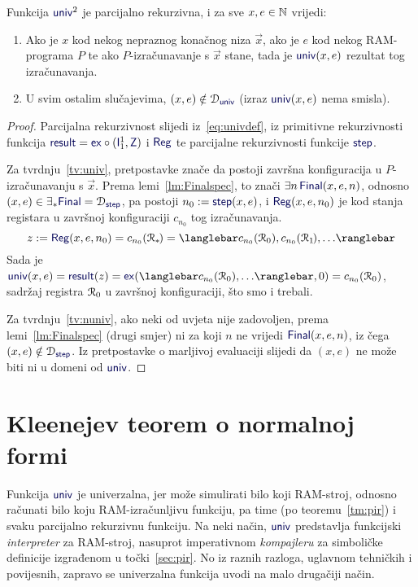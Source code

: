 \begin{lema}[{name=[parcijalna rekurzivnost univerzalne funkcije]}]\label{lm:univspec}
Funkcija $\f{univ}^2$ je parcijalno rekurzivna, i za sve $x,e\in{\mathbb N}$ vrijedi:
\begin{enumerate}
    \item\label{tv:univ} Ako je $x$ kod nekog nepraznog konačnog niza $\vec x$, ako je $e$ kod nekog RAM-programa $P$ te ako $P$-izračunavanje s $\vec x$ stane, tada je $\f{univ}(x,e)$ rezultat tog izračunavanja.
    \item\label{tv:nuniv} U svim ostalim slučajevima, $(x,e)\notin\dom{\f{univ}}$ (izraz $\f{univ}(x,e)$ nema smisla).
\end{enumerate}
\end{lema}
\begin{proof}
Parcijalna rekurzivnost slijedi iz~\eqref{eq:univdef}, iz primitivne rekurzivnosti funkcija $\f{result}=\f{ex}\circ(\f I_1^1,\f Z)$ i $\f{Reg}$ te parcijalne rekurzivnosti funkcije $\f{step}$.

Za tvrdnju~\ref{tv:univ}, pretpostavke znače da postoji završna konfiguracija u $P$-izračunavanju s $\vec x$. Prema lemi~\ref{lm:Finalspec}, to znači $\exists n\,\f{Final}(x,e,n)$, odnosno $(x,e)\in\exists_*\f{Final}=\dom{\f{step}}$, pa postoji $n_0:=\f{step}(x,e)$, i $\f{Reg}(x,e,n_0)$ je kod stanja registara u završnoj konfiguraciji $c_{n_0}$ tog izračunavanja.
\begin{equation}
	z:=\f{Reg}(x,e,n_0)=c_{n_0}(\reg{*}\mspace{-2mu})=\knk{c_{n_0}(\reg0),c_{n_0}(\reg1\mspace{-2mu}),\dotsc}
\end{equation}
Sada je $\f{univ}(x,e)=\f{result}(z)=\f{ex}(\knk{c_{n_0}(\reg0),\dotsc},0)=c_{n_0}(\reg0)$, sadržaj registra $\mathcal R_{0}$ u završnoj konfiguraciji, što smo i trebali.

Za tvrdnju~\ref{tv:nuniv}, ako neki od  uvjeta nije zadovoljen, prema lemi~\ref{lm:Finalspec} (drugi smjer) ni za koji $n$ ne vrijedi $\f{Final}(x,e,n)$, iz čega $(x,e)\notin\dom{\f{step}}$. Iz pretpostavke o marljivoj evaluaciji slijedi da $(x,e)$ ne može biti ni u domeni od $\f{univ}$.
\end{proof}

\section{Kleenejev teorem o normalnoj formi}

Funkcija $\f{univ}$ je univerzalna, jer može simulirati bilo koji RAM-stroj, odnosno ra\-ču\-na\-ti bilo koju RAM-izračunljivu funkciju, pa time (po teoremu~\ref{tm:pir}) i svaku parcijalno rekurzivnu funkciju. Na neki način, $\f{univ}$ predstavlja funkcijski \emph{interpreter} za RAM-stroj, nasuprot imperativnom \emph{kompajleru} za simboličke definicije izgrađenom u točki~\ref{sec:pir}. No iz raznih razloga, uglavnom tehničkih i povijesnih, zapravo se univerzalna funkcija uvodi na malo drugačiji način.

